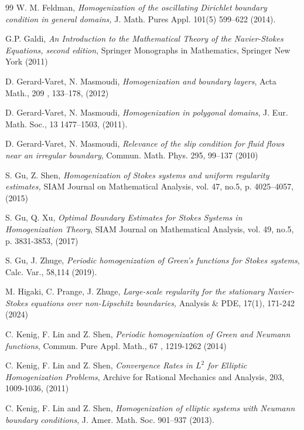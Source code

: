 \documentclass[11pt, reqno]{amsart}
\theoremstyle{definition}
\theoremstyle{remark}
\numberwithin{equation}{section}
\begin{document}
\begin{thebibliography}{99}
		 W. M. Feldman,
		\emph{Homogenization of the oscillating Dirichlet boundary condition in general domains,}
		J. Math. Pures Appl. 101(5)  599–622 (2014).		
		
		G.P. Galdi,
		\emph{An Introduction to the
		Mathematical Theory of the
		Navier-Stokes Equations, second edition}, Springer Monographs in Mathematics, Springer New York (2011)
		
		
		
		 D. Gerard-Varet, N. Masmoudi, \emph{Homogenization and boundary layers},	Acta Math., 209 , 133–178, (2012)
		
		 D. Gerard-Varet, N. Masmoudi, \emph{Homogenization in polygonal domains}, J. Eur. Math. Soc., 13 1477--1503, (2011).
		
		 D. Gerard-Varet, N. Masmoudi, \emph{Relevance of the slip condition for fluid flows near an irregular boundary},	Commun. Math. Phys. 295, 99–137 (2010)		
		
		 S. Gu, Z. Shen, \emph{Homogenization of Stokes systems and uniform regularity estimates,}
		SIAM Journal on Mathematical Analysis,
		vol. 47,
		no.5,
		p. 4025--4057,
		(2015)
		
		 S. Gu, Q. Xu, \emph{Optimal Boundary Estimates for Stokes Systems in Homogenization Theory},
		SIAM Journal on Mathematical Analysis,
		vol. 49,
		no.5,
		p. 3831-3853,
		(2017)
		
		S. Gu,  J. Zhuge, 
		\emph{Periodic homogenization of Green's functions for Stokes systems}, Calc. Var., 58,114 (2019). 
		
			M. Higaki, C. Prange, J. Zhuge, \emph{Large-scale regularity for the stationary Navier-Stokes equations over non-Lipschitz boundaries,} Analysis \& PDE, 17(1), 171-242 (2024)
		
		C. Kenig, F. Lin and Z. Shen, \emph{Periodic homogenization of Green and Neumann functions}, Commun. Pure Appl. Math., 67 , 1219-1262 (2014)
	
	C. Kenig, F. Lin and Z. Shen, \emph{Convergence Rates in $L^2$ for Elliptic Homogenization Problems}, Archive for Rational Mechanics and Analysis, 
		203, 1009-1036, (2011)
		
		C. Kenig, F. Lin and Z. Shen, 
		\emph{Homogenization of elliptic systems with Neumann boundary conditions}, J. Amer. Math. Soc. 901--937 (2013). 	
		

\end{thebibliography}
\end{document}
